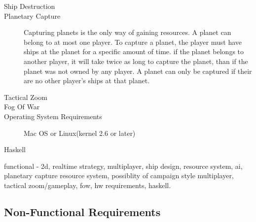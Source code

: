 \begin{description}
\item[Ship Destruction]






\item[Planetary Capture]
Capturing planets is the only way of gaining resources.
A planet can belong to at most one player.
To capture a planet, the player must have ships at the planet for a specific amount of time.
if the planet belongs to another player, it will take twice as long to capture the planet, than if the planet was not owned by any player.
A planet can only be captured if their are no other player's ships at that planet.


\item[Tactical Zoom]


\item[Fog Of War]



\item[Operating System Requirements]
Mac OS or Linux(kernel 2.6 or later) 

\item[Haskell]

\end{description}

functional - 2d, realtime strategy, multiplayer, ship design, resource system, ai, planetary capture resource system, possiblity of campaign style multiplayer, tactical zoom/gameplay, fow, hw requirements, haskell.


\subsection{Non-Functional Requirements}

